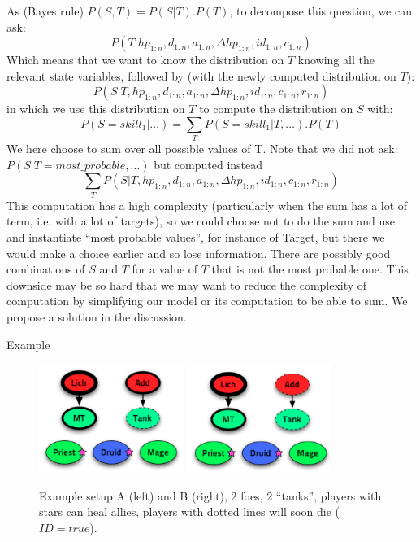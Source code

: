 As (Bayes rule) $P(S,T) = P(S|T).P(T)$, to decompose this question, we can ask:
$$P(T | hp_{1:n},d_{1:n}, a_{1:n}, \Delta hp_{1:n}, id_{1:n}, c_{1:n})$$ 
Which means that we want to know the distribution on $T$ knowing all the relevant state variables, followed by (with the newly computed distribution on $T$):
$$P(S | T, hp_{1:n},d_{1:n}, a_{1:n}, \Delta hp_{1:n}, id_{1:n}, c_{1:n}, r_{1:n})$$ 
in which we use this distribution on $T$ to compute the distribution on $S$ with:
$$P(S=skill_1 | \dots) = \sum_T P(S=skill_1 | T, \dots).P(T)$$
We here choose to sum over all possible values of T. Note that we did not ask:\\
$P(S|T=most\_probable , \dots)$ but computed instead
$$\sum_T P(S|T,hp_{1:n},d_{1:n}, a_{1:n}, \Delta hp_{1:n}, id_{1:n}, c_{1:n}, r_{1:n})$$
This computation has a high complexity (particularly when the sum has a lot of term, i.e. with a lot of targets), so we could choose not to do the sum and use and instantiate ``most probable values'', for instance of Target, but there we would make a choice earlier and so lose information. There are possibly good combinations of $S$ and $T$ for a value of $T$ that is not the most probable one. This downside may be so hard that we may want to reduce the complexity of computation by simplifying our model or its computation to be able to sum. We propose a solution in the discussion.

\begin{center}
Example
\end{center}

\begin{figure}[h!]
\begin{center}
\includegraphics[width=4.7cm]{images/wow_fight1.png} \hspace{1cm} \includegraphics[width=4.7cm]{images/wow_fight2.png}
\caption{Example setup A (left) and B (right), 2 foes, 2 “tanks”, players with stars can heal allies, players with dotted lines will soon die ($ID=true$).}
\label{fig:wow_fight}
\end{center}
\end{figure}

